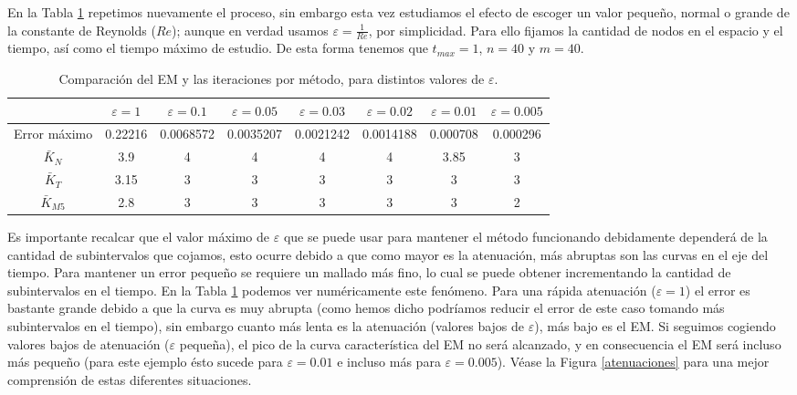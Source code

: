 En la Tabla \ref{compe} repetimos nuevamente el proceso, sin embargo esta vez estudiamos el efecto de escoger un valor pequeño, normal o grande de la constante de Reynolds ($Re$); aunque en verdad usamos $\varepsilon=\frac{1}{Re}$, por simplicidad. Para ello fijamos la cantidad de nodos en el espacio y el tiempo, así como el tiempo máximo de estudio. De esta forma tenemos que $t_{max}=1$,	$n=40$ y $m=40$.

\begin{table}[h!]
	\centering
	\small
	\begin{tabular}{cccccccc}
		\toprule
		&\boldmath $\varepsilon = 1$ &\boldmath $\varepsilon = 0.1$ &\boldmath $\varepsilon = 0.05$ &\boldmath $\varepsilon = 0.03$ &\boldmath $\varepsilon = 0.02$ &\boldmath $\varepsilon = 0.01$ &\boldmath $\varepsilon = 0.005$ \\ \midrule
		\multicolumn{1}{c}{Error máximo}    & 0.22216 & 0.0068572 & 0.0035207 & 0.0021242 & 0.0014188 & 0.000708 & 0.000296 \\
		\multicolumn{1}{c}{$\bar{K}_{N}$} & 3.9 & 4 & 4 & 4 & 4 & 3.85 & 3 \\
		\multicolumn{1}{c}{$\bar{K}_{T}$}  & 3.15 & 3 & 3 & 3 & 3 & 3 & 3 \\
		\multicolumn{1}{c}{$\bar{K}_{M5}$}     & 2.8 & 3 & 3 & 3 & 3 & 3 & 2 \\ \bottomrule
	\end{tabular}
	\caption{Comparación del EM y las iteraciones por método, para distintos valores de $\varepsilon$.}\label{compe}
\end{table}

Es importante recalcar que el valor máximo de $\varepsilon$ que se puede usar para mantener el método funcionando debidamente dependerá de la cantidad de subintervalos que cojamos, esto ocurre debido a que como mayor es la atenuación, más abruptas son las curvas en el eje del tiempo. Para mantener un error pequeño se requiere un mallado más fino, lo cual se puede obtener incrementando la cantidad de subintervalos en el tiempo. En la Tabla \ref{compe} podemos ver numéricamente este fenómeno. Para una rápida atenuación ($\varepsilon = 1$) el error es bastante grande debido a que la curva es muy abrupta (como hemos dicho podríamos reducir el error de este caso tomando más subintervalos en el tiempo), sin embargo cuanto más lenta es la atenuación (valores bajos de $\varepsilon$), más bajo es el EM. Si seguimos cogiendo valores bajos de atenuación ($\varepsilon$ pequeña), el pico de la curva característica del EM no será alcanzado, y en consecuencia el EM será incluso más pequeño (para este ejemplo ésto sucede para $\varepsilon = 0.01$ e incluso más para $\varepsilon = 0.005$). Véase la Figura \ref{atenuaciones} para una mejor comprensión de estas diferentes situaciones.

